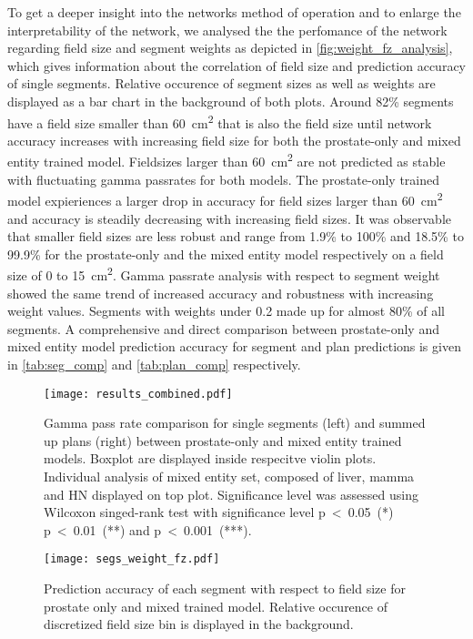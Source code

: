 To get a deeper insight into the networks method of operation and to enlarge the interpretability of the network, we analysed the the perfomance of the network regarding field size and segment weights as depicted in \autoref{fig:weight_fz_analysis}, which gives information about the correlation of field size and prediction accuracy of single segments. 
Relative occurence of segment sizes as well as weights are displayed as a bar chart in the background of both plots.
Around 82\% segments have a field size smaller than 60~cm\textsuperscript{2} that is also the field size until network accuracy increases with increasing field size for both the prostate-only and mixed entity trained model.
Fieldsizes larger than 60~cm\textsuperscript{2} are not predicted as stable with fluctuating gamma passrates for both models.
The prostate-only trained model expieriences a larger drop in accuracy for field sizes larger than 60~cm\textsuperscript{2} and accuracy is steadily decreasing with increasing field sizes. 
It was observable that smaller field sizes are less robust and range from 1.9\% to 100\% and 18.5\% to 99.9\% for the prostate-only and the mixed entity model respectively on a field size of 0 to 15~cm\textsuperscript{2}.
Gamma passrate analysis with respect to segment weight showed the same trend of increased accuracy and robustness with increasing weight values.
Segments with weights under 0.2 made up for almost 80\% of all segments. 
A comprehensive and direct comparison between prostate-only and mixed entity model prediction accuracy for segment and plan predictions is given in \autoref{tab:seg_comp} and \autoref{tab:plan_comp} respectively.

\begin{figure}[htb]
    \centering
    \texttt{[image: results\_combined.pdf]}
    \caption{
        Gamma pass rate comparison for single segments (left) and summed up plans (right) between prostate-only and mixed entity trained models. 
        Boxplot are displayed inside respecitve violin plots. 
        Individual analysis of mixed entity set, composed of liver, mamma and \acs{HN} displayed on top plot. 
        Significance level was assessed using Wilcoxon singed-rank test with significance level p~<~0.05~(*) p~<~0.01~(**) and  p~<~0.001~(***).
    }\label{fig:comparison}
\end{figure}

\newpage

\begin{figure}[!h]
    \centering
    \texttt{[image: segs\_weight\_fz.pdf]}
    \caption{
        Prediction accuracy of each segment with respect to field size for prostate only and mixed trained model. 
        Relative occurence of discretized field size bin is displayed in the background.}\label{fig:weight_fz_analysis}
\end{figure}

